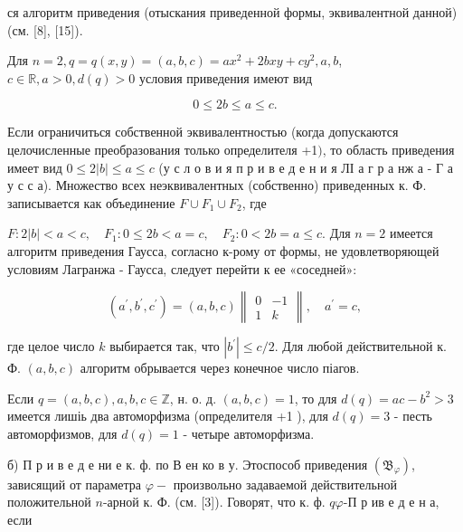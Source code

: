\documentclass[10pt]{article}
\begin{document}
ся алгоритм приведения (отыскания приведенной формы, эквивалентной данной) (см. [8], [15]).



Для $n=2, q=q(x, y)=(a, b, c)=a x^{2}+2 b x y+c y^{2}, a, b$, $c \in \mathbb{R}, a>0, d(q)>0$ условия приведения имеют вид



\[

0 \leqslant 2 b \leqslant a \leqslant c .

\]



Если ограничиться собственной эквивалентностью (когда допускаются целочисленные преобразования только определителя +1$)$, то область приведения имеет вид $0 \leqslant 2|b| \leqslant a \leqslant c$ (у с л о в и я п р и в е д е н и я ЛІ а г р а нж а - Г а у с с а). Множество всех неэквивалентных (собственно) приведенных к. Ф. записывается как объединение $F \cup F_{1} \cup F_{2}$, где



$F: 2|b|<a<c, \quad F_{1}: 0 \leqslant 2 b<a=c, \quad F_{2}: 0<2 b=a \leqslant c$. Для $n=2$ имеется алгоритм приведения Гаусса, согласно к-рому от формы, не удовлетворяющей условиям Лагранжа - Гаусса, следует перейти к ее «соседней»:



\[

\left(a^{\prime}, b^{\prime}, c^{\prime}\right)=(a, b, c)\left\|\begin{array}{lr}

0 & -1 \\

1 & k

\end{array}\right\|, \quad a^{\prime}=c,

\]



где целое число $k$ выбирается так, что $\left|b^{\prime}\right| \leqslant c / 2$. Для любой действительной к. Ф. $(a, b, c)$ алгоритм обрывается через конечное число піагов.



Если $q=(a, b, c), a, b, c \in \mathbb{Z}$, н. о. д. $(a, b, c)=1$, то для $d(q)=a c-b^{2}>3$ имеется лишіь два автоморфизма (определителя +1 ), для $d(q)=3$ - песть автоморфизмов, для $d(q)=1$ - четыре автоморфизма.



б) П р и в е д е ни е к. ф. по В ен ко в у. Этоспособ приведения $\left(\mathfrak{B}_{\varphi}\right)$, зависящий от параметра $\varphi-$ произвольно задаваемой действительной положительной $n$-арной к. Ф. (см. [3]). Говорят, что к. ф. $q \varphi$-П р ив е д е н а, если
\end{document}
